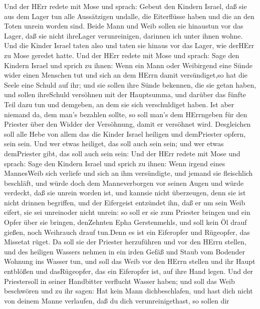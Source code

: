  Und der HErr redete mit Mose und sprach: 
Gebeut den Kindern Israel, daß sie aus dem Lager tun alle Aussätzigen
undalle, die Eiterflüsse haben und die an den Toten unrein worden sind.
 Beide Mann und Weib sollen sie hinaustun vor das Lager, daß
sie nicht ihreLager verunreinigen, darinnen ich unter ihnen wohne.
 Und die Kinder Israel taten also und taten sie hinaus vor
das Lager, wie derHErr zu Mose geredet hatte.  Und der HErr
redete mit Mose und sprach:  Sage den Kindern Israel und
sprich zu ihnen: Wenn ein Mann oder Weibirgend eine Sünde wider einen
Menschen tut und sich an dem HErrn damit versündiget,so hat die Seele
eine Schuld auf ihr;  und sie sollen ihre Sünde bekennen,
die sie getan haben, und sollen ihreSchuld versöhnen mit der Hauptsumma,
und darüber das fünfte Teil dazu tun und demgeben, an dem sie sich
verschuldiget haben.  Ist aber niemand da, dem man's
bezahlen sollte, so soll man's dem HErrngeben für den Priester über den
Widder der Versöhnung, damit er versöhnet wird.  Desgleichen
soll alle Hebe von allem das die Kinder Israel heiligen und demPriester
opfern, sein sein.  Und wer etwas heiliget, das soll auch
sein sein; und wer etwas demPriester gibt, das soll auch sein sein:
 Und der HErr redete mit Mose und sprach: 
Sage den Kindern Israel und sprich zu ihnen: Wenn irgend eines
MannesWeib sich verliefe und sich an ihm versündigte,  und
jemand sie fleischlich beschläft, und würde doch dem Manneverborgen vor
seinen Augen und würde verdeckt, daß sie unrein worden ist, und kannsie
nicht überzeugen, denn sie ist nicht drinnen begriffen, 
und der Eifergeist entzündet ihn, daß er um sein Weib eifert, sie sei
unreinoder nicht unrein:  so soll er sie zum Priester
bringen und ein Opfer über sie bringen, denZehnten Epha Gerstenmehls,
und soll kein Öl drauf gießen, noch Weihrauch drauf tun.Denn es ist ein
Eiferopfer und Rügeopfer, das Missetat rüget.  Da soll sie
der Priester herzuführen und vor den HErrn stellen,  und
des heiligen Wassers nehmen in ein irden Gefäß und Staub vom Bodender
Wohnung ins Wasser tun,  und soll das Weib vor den HErrn
stellen und ihr Haupt entblößen und dasRügeopfer, das ein Eiferopfer
ist, auf ihre Hand legen. Und der Priestersoll in seiner Handbitter
verflucht Wasser haben;  und soll das Weib beschwören und
zu ihr sagen: Hat kein Mann dichbeschlafen, und hast dich nicht von
deinem Manne verlaufen, daß du dich verunreinigethast, so sollen dir
